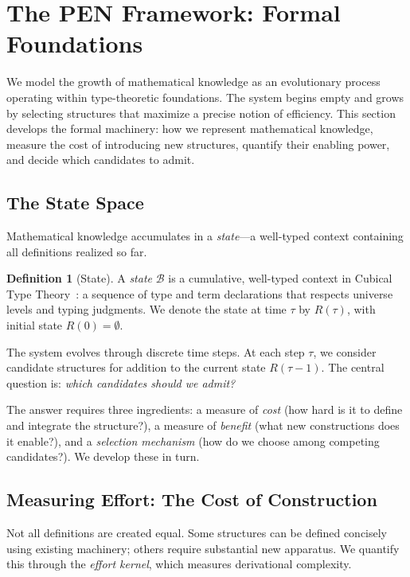 \documentclass[11pt]{article}
\theoremstyle{definition}
\newtheorem{definition}[theorem]{Definition}
\theoremstyle{remark}
\begin{document}
\section{The PEN Framework: Formal Foundations}
\label{sec:framework}

We model the growth of mathematical knowledge as an evolutionary process operating within type-theoretic foundations. The system begins empty and grows by selecting structures that maximize a precise notion of efficiency. This section develops the formal machinery: how we represent mathematical knowledge, measure the cost of introducing new structures, quantify their enabling power, and decide which candidates to admit.

\subsection{The State Space}

Mathematical knowledge accumulates in a \emph{state}---a well-typed context containing all definitions realized so far.

\begin{definition}[State]
\label{def:state}
A \emph{state} $\mathcal{B}$ is a cumulative, well-typed context in Cubical Type Theory~\cite{cohen2018cubical}: a sequence of type and term declarations that respects universe levels and typing judgments. We denote the state at time $\tau$ by $R(\tau)$, with initial state $R(0) = \emptyset$.
\end{definition}

The system evolves through discrete time steps. At each step $\tau$, we consider candidate structures for addition to the current state $R(\tau - 1)$. The central question is: \emph{which candidates should we admit?}

The answer requires three ingredients: a measure of \emph{cost} (how hard is it to define and integrate the structure?), a measure of \emph{benefit} (what new constructions does it enable?), and a \emph{selection mechanism} (how do we choose among competing candidates?). We develop these in turn.

\subsection{Measuring Effort: The Cost of Construction}

Not all definitions are created equal. Some structures can be defined concisely using existing machinery; others require substantial new apparatus. We quantify this through the \emph{effort kernel}, which measures derivational complexity.
\end{document}
